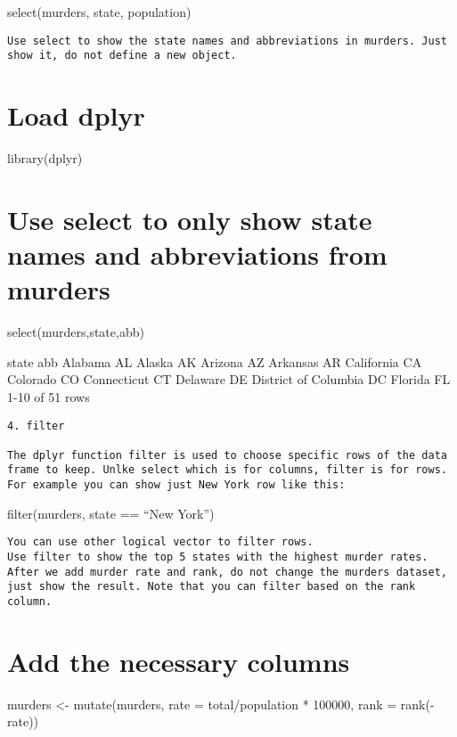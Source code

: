 \documentclass[
]{article}
\begin{document}
select(murders, state, population)

\begin{verbatim}
Use select to show the state names and abbreviations in murders. Just show it, do not define a new object.
\end{verbatim}

\hypertarget{load-dplyr}{%
\section{Load dplyr}\label{load-dplyr}}

library(dplyr)

\hypertarget{use-select-to-only-show-state-names-and-abbreviations-from-murders}{%
\section{Use select to only show state names and abbreviations from
murders}\label{use-select-to-only-show-state-names-and-abbreviations-from-murders}}

select(murders,state,abb)

state abb Alabama AL Alaska AK Arizona AZ Arkansas AR California CA
Colorado CO Connecticut CT Delaware DE District of Columbia DC Florida
FL 1-10 of 51 rows

\begin{verbatim}
4. filter
    
The dplyr function filter is used to choose specific rows of the data frame to keep. Unlke select which is for columns, filter is for rows. For example you can show just New York row like this:
\end{verbatim}

filter(murders, state == ``New York'')

\begin{verbatim}
You can use other logical vector to filter rows.
Use filter to show the top 5 states with the highest murder rates. After we add murder rate and rank, do not change the murders dataset, just show the result. Note that you can filter based on the rank column.
\end{verbatim}

\hypertarget{add-the-necessary-columns}{%
\section{Add the necessary columns}\label{add-the-necessary-columns}}

murders \textless- mutate(murders, rate = total/population * 100000,
rank = rank(-rate))
\end{document}
